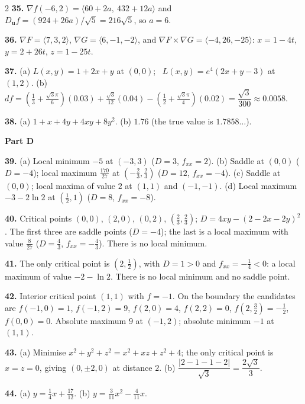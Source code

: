 \documentclass[11pt,oneside]{article}
\newcommand{\bu}{\mathbf{u}}
\newcommand{\grad}{\nabla}
\begin{document}
{\begin{multicols}{2}
\textbf{35.} $\grad f(-6,2)=\langle60+2a,\ 432+12a\rangle$ and
$D_{\bu}f=(924+26a)/\sqrt5=216\sqrt5$, so $a=6$.

\textbf{36.} $\grad F=\langle7,3,2\rangle$, $\grad G=\langle6,-1,-2\rangle$, and
$\grad F\times\grad G=\langle-4,26,-25\rangle$:
$x=1-4t$, $y=2+26t$, $z=1-25t$.

\textbf{37.} (a) $L(x,y)=1+2x+y$ at $(0,0)$; \
$L(x,y)=e^{4}(2x+y-3)$ at $(1,2)$.\quad
(b) $df=\left(\tfrac13+\tfrac{\sqrt3\pi}{6}\right)(0.03)+\tfrac{\sqrt3}{12}(0.04)
-\left(\tfrac12+\tfrac{\sqrt3\pi}{4}\right)(0.02)=\dfrac{\sqrt3}{300}\approx0.0058$.

\textbf{38.} (a) $1+x+4y+4xy+8y^{2}$.\quad
(b) $1.76$ (the true value is $1.7858\ldots$).

\vspace{4pt}
\textbf{Part D}\par\vspace{2pt}

\textbf{39.} (a) Local minimum $-5$ at $(-3,3)$ ($D=3$, $f_{xx}=2$).\quad
(b) Saddle at $(0,0)$ ($D=-4$); local maximum $\tfrac{170}{27}$ at
$\left(-\tfrac23,\tfrac23\right)$ ($D=12$, $f_{xx}=-4$).\quad
(c) Saddle at $(0,0)$; local maxima of value $2$ at $(1,1)$ and $(-1,-1)$.\quad
(d) Local maximum $-3-2\ln2$ at $\left(\tfrac12,1\right)$ ($D=8$, $f_{xx}=-8$).

\textbf{40.} Critical points $(0,0)$, $(2,0)$, $(0,2)$, $\left(\tfrac23,\tfrac23\right)$;
$D=4xy-(2-2x-2y)^{2}$. The first three are saddle points ($D=-4$); the last is a local maximum
with value $\tfrac{8}{27}$ ($D=\tfrac43$, $f_{xx}=-\tfrac43$). There is no local minimum.

\textbf{41.} The only critical point is $\left(2,\tfrac12\right)$, with $D=1>0$ and
$f_{xx}=-\tfrac14<0$: a local maximum of value $-2-\ln2$. There is no local minimum and no
saddle point.

\textbf{42.} Interior critical point $(1,1)$ with $f=-1$. On the boundary the candidates are
$f(-1,0)=1$, $f(-1,2)=9$, $f(2,0)=4$, $f(2,2)=0$, $f\!\left(2,\tfrac32\right)=-\tfrac12$,
$f(0,0)=0$. Absolute maximum $9$ at $(-1,2)$; absolute minimum $-1$ at $(1,1)$.

\textbf{43.} (a) Minimise $x^{2}+y^{2}+z^{2}=x^{2}+xz+z^{2}+4$; the only critical point is
$x=z=0$, giving $(0,\pm2,0)$ at distance $2$.\quad
(b) $\dfrac{|2-1-1-2|}{\sqrt3}=\dfrac{2\sqrt3}{3}$.

\textbf{44.} (a) $y=\tfrac14x+\tfrac{17}{12}$.\quad
(b) $y=\tfrac{3}{11}x^{2}-\tfrac{4}{11}x$.


\end{multicols}}
\end{document}
